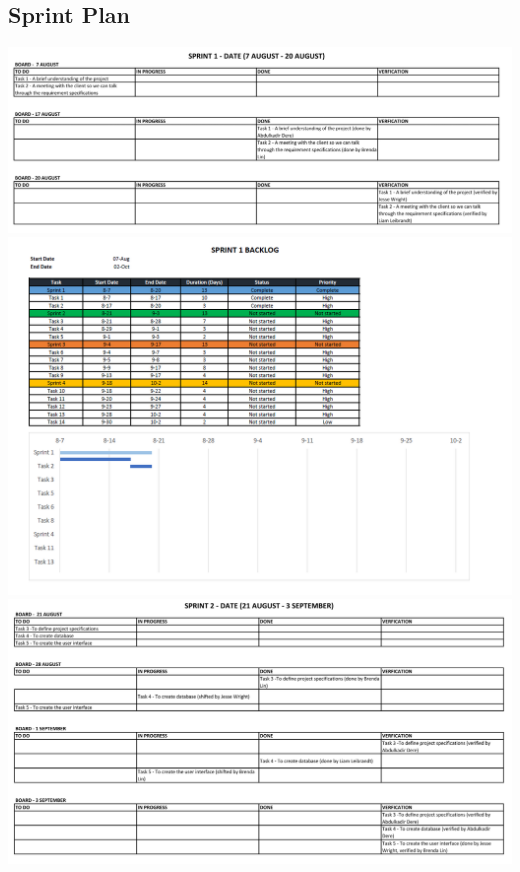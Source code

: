 \documentclass{article}
\begin{document}
\subsection{Sprint Plan}
\includegraphics[scale=0.5]{Sprint1.png}\\
\includegraphics[scale=0.65]{Sprint1Backlog.PNG}\\
\includegraphics[scale=0.5]{Sprint2.png}\\
\end{document}
